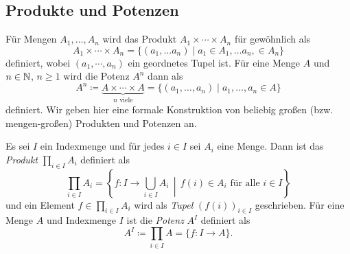 \subsection{Produkte und Potenzen}
Für Mengen $A_1, \dotsc, A_n$ wird das Produkt $A_1 \times \dotsb \times A_n$ für gewöhnlich als
\[
 A_1 \times \dotsb \times A_n
 = \{(a_1, \dotsc a_n) \mid a_1 \in A_1, \dotsc a_n, \in A_n\}
\]
definiert, wobei $(a_1, \dotsb, a_n)$ ein geordnetes Tupel ist. Für eine Menge $A$ und $n \in \mathbb{N}$, $n \geq 1$ wird die Potenz $A^n$ dann als
\[
 A^n
 \coloneqq \underbrace{A \times \dotsb \times A}_{\text{$n$ viele}}
 = \{(a_1, \dotsc, a_n) \mid a_1, \dotsc, a_n \in A\}
\]
definiert. Wir geben hier eine formale Konstruktion von beliebig großen (bzw. mengen-großen) Produkten und Potenzen an.


\begin{defi}
 Es sei $I$ ein Indexmenge und für jedes $i \in I$ sei $A_i$ eine Menge. Dann ist das \emph{Produkt} $\prod_{i \in I} A_i$ definiert als
 \[
  \prod_{i \in I} A_i
  = \left\{ f \colon I \to \bigcup_{i \in I} A_i \,\middle|\, \text{$f(i) \in A_i$ für alle $i \in I$} \right\}
 \]
 und ein Element $f \in \prod_{i \in I} A_i$ wird als \emph{Tupel} $(f(i))_{i \in I}$ geschrieben. Für eine Menge $A$ und Indexmenge $I$ ist die \emph{Potenz} $A^I$ definiert als
 \[
  A^I
  \coloneqq \prod_{i \in I} A
  = \{f \colon I \to A\}.
 \]

\end{defi}



